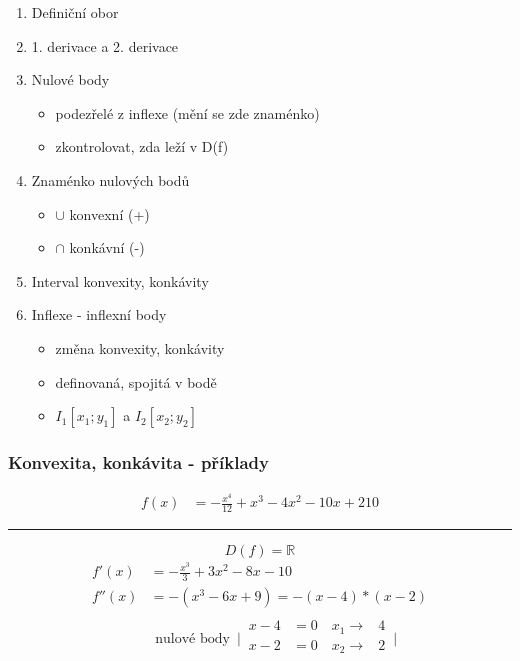 \begin{enumerate}
  \item Definiční obor
  \item 1. derivace a 2. derivace
  \item Nulové body
    \begin{itemize}
      \item podezřelé z inflexe (mění se zde znaménko)
      \item zkontrolovat, zda leží v D(f)
    \end{itemize}
  \item Znaménko nulových bodů
    \begin{itemize}
      \item $\cup$ konvexní (+)
      \item $\cap$ konkávní (-)
    \end{itemize}
  \item Interval konvexity, konkávity
  \item Inflexe - inflexní body
    \begin{itemize}
      \item změna konvexity, konkávity
      \item definovaná, spojitá v bodě
      \item $I_1[x_1;y_1]$ a $I_2[x_2;y_2]$
    \end{itemize}
\end{enumerate}
\subsubsection{Konvexita, konkávita - příklady}
\begin{align*}
  f(x)&=-\frac{x^4}{12}+x^3-4x^2-10x+210
\end{align*}
\hrule
$$D(f)=\mathbb{R}$$
\begin{align*}
  f'(x)&=-\frac{x^3}{3}+3x^2-8x-10\\
  f''(x)&=-(x^3-6x+9)=-(x-4)*(x-2)\\
  &\begin{alignedat}{2}
    \text{nulové body  }\,
    \Biggr|\,
    \begin{alignedat}{2}
      x-4 &=0 \quad x_1 \rightarrow &4 \\
      x-2 &=0 \quad x_2 \rightarrow &2 \\
    \end{alignedat}
    \,\Biggr|
  \end{alignedat}
\end{align*}

